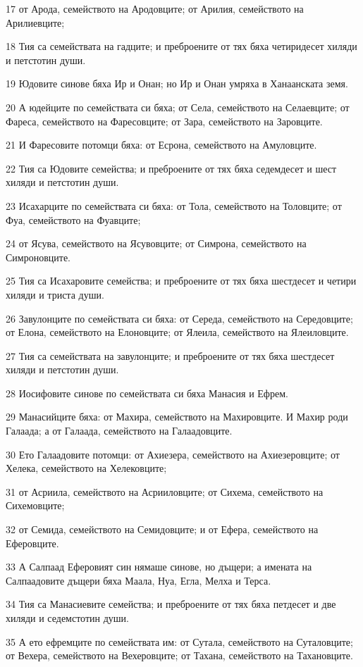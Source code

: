 \par 17 от Арода, семейството на Ародовците; от Арилия, семейството на Арилиевците;
\par 18 Тия са семействата на гадците; и преброените от тях бяха четиридесет хиляди и петстотин души.
\par 19 Юдовите синове бяха Ир и Онан; но Ир и Онан умряха в Ханаанската земя.
\par 20 А юдейците по семействата си бяха; от Села, семейството на Селаевците; от Фареса, семейството на Фаресовците; от Зара, семейството на Заровците.
\par 21 И Фаресовите потомци бяха: от Есрона, семейството на Амуловците.
\par 22 Тия са Юдовите семейства; и преброените от тях бяха седемдесет и шест хиляди и петстотин души.
\par 23 Исахарците по семействата си бяха: от Тола, семейството на Толовците; от Фуа, семейството на Фуавците;
\par 24 от Ясува, семейството на Ясувовците; от Симрона, семейството на Симроновците.
\par 25 Тия са Исахаровите семейства; и преброените от тях бяха шестдесет и четири хиляди и триста души.
\par 26 Завулонците по семействата си бяха: от Середа, семейството на Середовците; от Елона, семейството на Елоновците; от Ялеила, семейството на Ялеиловците.
\par 27 Тия са семействата на завулонците; и преброените от тях бяха шестдесет хиляди и петстотин души.
\par 28 Иосифовите синове по семействата си бяха Манасия и Ефрем.
\par 29 Манасийците бяха: от Махира, семейството на Махировците. И Махир роди Галаада; а от Галаада, семейството на Галаадовците.
\par 30 Ето Галаадовите потомци: от Ахиезера, семейството на Ахиезеровците; от Хелека, семейството на Хелековците;
\par 31 от Асриила, семейството на Асрииловците; от Сихема, семейството на Сихемовците;
\par 32 от Семида, семейството на Семидовците; и от Ефера, семейството на Еферовците.
\par 33 А Салпаад Еферовият син нямаше синове, но дъщери; а имената на Салпаадовите дъщери бяха Маала, Нуа, Егла, Мелха и Терса.
\par 34 Тия са Манасиевите семейства; и преброените от тях бяха петдесет и две хиляди и седемстотин души.
\par 35 А ето ефремците по семействата им: от Сутала, семейството на Суталовците; от Вехера, семейството на Вехеровците; от Тахана, семейството на Тахановците.
